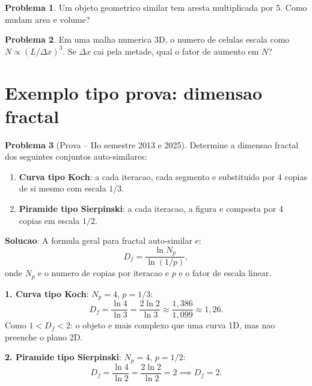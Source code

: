 \documentclass[12pt,a4paper,oneside]{book}
\theoremstyle{definition}
\newtheorem{problem}{Problema}
\begin{document}
\begin{problem}
Um objeto geometrico similar tem aresta multiplicada por 5. Como mudam area e volume?
\end{problem}

\begin{problem}
Em uma malha numerica 3D, o numero de celulas escala como $N \propto (L/\Delta x)^3$. Se $\Delta x$ cai pela metade, qual o fator de aumento em $N$?
\end{problem}

\section{Exemplo tipo prova: dimensao fractal}

\begin{problem}[Prova -- IIo semestre 2013 e 2025]
Determine a dimensao fractal dos seguintes conjuntos auto-similares:
\begin{enumerate}
    \item \textbf{Curva tipo Koch}: a cada iteracao, cada segmento e substituido por
    4 copias de si mesmo com escala $1/3$.
    \item \textbf{Piramide tipo Sierpinski}: a cada iteracao, a figura e composta por
    4 copias em escala $1/2$.
\end{enumerate}
\end{problem}

\textbf{Solucao}: A formula geral para fractal auto-similar e:
\begin{equation}
D_f = \frac{\ln N_p}{\ln(1/p)},
\end{equation}
onde $N_p$ e o numero de copias por iteracao e $p$ e o fator de escala linear.

\textbf{1. Curva tipo Koch}: $N_p = 4$, $p = 1/3$:
\begin{equation}
D_f = \frac{\ln 4}{\ln 3} = \frac{2\ln 2}{\ln 3} \approx \frac{1{,}386}{1{,}099} \approx \boxed{1{,}26}.
\end{equation}
Como $1 < D_f < 2$: o objeto e mais complexo que uma curva 1D, mas nao preenche o plano 2D.

\textbf{2. Piramide tipo Sierpinski}: $N_p = 4$, $p = 1/2$:
\begin{equation}
D_f = \frac{\ln 4}{\ln 2} = \frac{2\ln 2}{\ln 2} = 2 \implies \boxed{D_f = 2}.
\end{equation}
\end{document}
